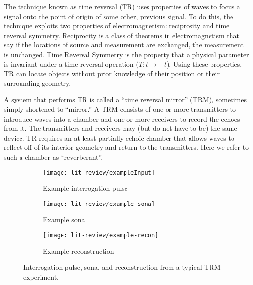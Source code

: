 The technique known as time reversal (TR) uses properties of waves to focus a signal onto the point of origin of some other, previous signal. To do this, the technique exploits two properties of electromagnetism: reciprosity and time reversal symmetry. Reciprocity is a class of theorems in electromagnetism that say if the locations of source and measurement are exchanged, the measurement is unchanged. Time Reversal Symmetry is the property that a physical parameter is invariant under a time reversal operation ($T : t\rightarrow-t$). Using these properties, TR can locate objects without prior knowledge of their position or their surrounding geometry.

A system that performs TR is called a ``time reversal mirror'' (TRM), sometimes simply shortened to ``mirror.'' A TRM consists of one or more transmitters to introduce waves into a chamber and one or more receivers to record the echoes from it. The transmitters and receivers may (but do not have to be) the same device. TR requires an at least partially echoic chamber that allows waves to reflect off of its interior geometry and return to the transmitters. Here we refer to such a chamber as ``reverberant''.

\begin{figure}
    \centering
    \begin{subfigure}{.60\textwidth}
        \centering
        \texttt{[image: lit-review/exampleInput]}
        \caption[Example Interrogation Pulse]{Example interrogation pulse}
        \label{fig:lit-review-example-interro}
    \end{subfigure}
    		\par\bigskip
    \begin{subfigure}{.60\textwidth}
        \centering
        \texttt{[image: lit-review/example-sona]}
        \caption[Example sona]{Example sona}
        \label{fig:lit-review-example-sona}
    \end{subfigure}
		\par\bigskip
    \begin{subfigure}{.60\textwidth}
        \centering
        \texttt{[image: lit-review/example-recon]}
        \caption[Example reconstruction]{Example reconstruction}
        \label{fig:lit-review-example-recon}
    \end{subfigure}
    \caption{Interrogation pulse, sona, and reconstruction from a typical TRM experiment.}
    \label{fig:lit-review-example}
\end{figure}

